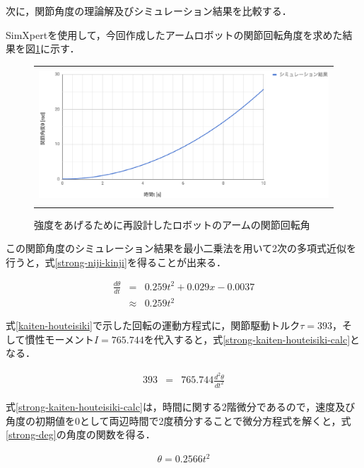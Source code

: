 次に，関節角度の理論解及びシミュレーション結果を比較する．

SimXpertを使用して，今回作成したアームロボットの関節回転角度を求めた結果を図\ref{strong-kaiten}に示す．

\begin{figure}[htbp]
  \begin{center}
    \begin{tabular}{c}
      \includegraphics[height=5.0cm]{img/eps/strong-kaiten2.eps}
    \end{tabular}
    \caption{強度をあげるために再設計したロボットのアームの関節回転角}
    \label{strong-kaiten}
  \end{center}
\end{figure}

この関節角度のシミュレーション結果を最小二乗法を用いて2次の多項式近似を行うと，式\ref{strong-niji-kinji}を得ることが出来る．

\begin{eqnarray}
  \frac{d\theta}{dt} &=& 0.259t^2+0.029x-0.0037 \nonumber \\
  &\approx& 0.259t^2
  \label{strong-niji-kinji}
\end{eqnarray}

式\ref{kaiten-houteisiki}で示した回転の運動方程式に，関節駆動トルク\(\tau=393\)，そして慣性モーメント\(I=765.744\)を代入すると，式\ref{strong-kaiten-houteisiki-calc}となる．

\begin{eqnarray}
  393 &=& 765.744 \frac{d^2 \theta}{d t^2}
  \label{strong-kaiten-houteisiki-calc}
\end{eqnarray}

式\ref{strong-kaiten-houteisiki-calc}は，時間に関する2階微分であるので，速度及び角度の初期値を0として両辺時間で2度積分することで微分方程式を解くと，式\ref{strong-deg}の角度の関数を得る．

\begin{eqnarray}
  \theta = 0.2566t^2
  \label{strong-deg}
\end{eqnarray}

